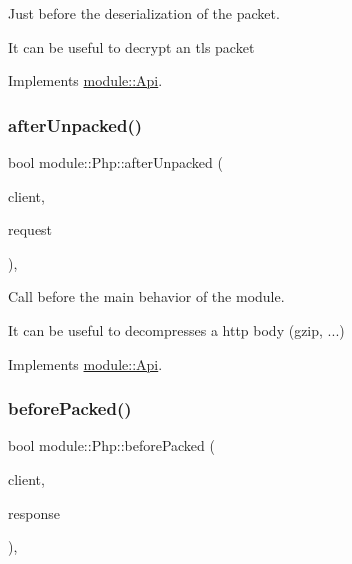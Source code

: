 Just before the deserialization of the packet. 

It can be useful to decrypt an tls packet 

Implements \hyperlink{structmodule_1_1Api_ad8b56820e4f53bf65d34447184edef20}{module\+::\+Api}.

\mbox{\label{classmodule_1_1Php_ae3f23ea75718c51e0427fa2d13ab9755}} 
\subsubsection{\texorpdfstring{after\+Unpacked()}{afterUnpacked()}}
{\footnotesize\ttfamily bool module\+::\+Php\+::after\+Unpacked (\begin{DoxyParamCaption}\item[{const \hyperlink{structnet_1_1IClient}{net\+::\+I\+Client} \&}]{client,  }\item[{\hyperlink{structhttp_1_1IRequest}{http\+::\+I\+Request} \&}]{request }\end{DoxyParamCaption})\hspace{0.3cm}{\ttfamily [virtual]}, {\ttfamily [noexcept]}}



Call before the main behavior of the module. 

It can be useful to decompresses a http body (gzip, ...) 

Implements \hyperlink{structmodule_1_1Api_a291297e6d233e69b82c976e085f7c237}{module\+::\+Api}.

\mbox{\label{classmodule_1_1Php_a71b22ae01eedfd3406d01907cd7dc3d9}} 
\subsubsection{\texorpdfstring{before\+Packed()}{beforePacked()}}
{\footnotesize\ttfamily bool module\+::\+Php\+::before\+Packed (\begin{DoxyParamCaption}\item[{const \hyperlink{structnet_1_1IClient}{net\+::\+I\+Client} \&}]{client,  }\item[{\hyperlink{structhttp_1_1IResponse}{http\+::\+I\+Response} \&}]{response }\end{DoxyParamCaption})\hspace{0.3cm}{\ttfamily [virtual]}, {\ttfamily [noexcept]}}




